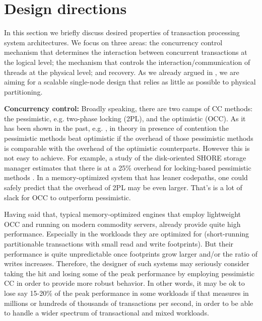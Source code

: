 \section{Design directions}

In this section we briefly discuss desired properties of transaction processing system architectures. We focus on three areas: the concurrency control mechanism that determines the interaction between concurrent transactions at the logical level; the mechanism that controls the interaction/communication of threads at the physical level; and recovery. As we already argued in , we are aiming for a scalable single-node design that relies as little as possible to physical partitioning.  

\vspace{2mm} 
{\bf Concurrency control:} 
Broadly speaking, there are two camps of CC methods: the pessimistic, e.g. two-phase locking (2PL), and the optimistic (OCC). As it has been shown in the past, e.g. \cite{AgrawalCL87}, in theory in presence of contention the  pessimistic methods beat optimistic if the overhead of those pessimistic methods is comparable with the overhead of the optimistic counterparts. However this is not easy to achieve. For example, a study of the disk-oriented SHORE storage manager estimates that there is at a 25\% overhead for locking-based pessimistic methods \cite{HarizopoulosAMS08}. In a memory-optimized system that has leaner codepaths, one could safely predict that the overhead of 2PL may be even larger. That's is a lot of slack for OCC to outperform pessimistic.

Having said that, typical memory-optimized engines that employ lightweight OCC and running on modern commodity servers, already provide quite high performance. Especially in the workloads they are optimized for (short-running partitionable transactions with small read and write footprints). But their performance is quite unpredictable once footprints grow larger and/or the ratio of writes increases. Therefore, the designer of such systems may seriously consider taking the hit and losing some of the peak performance by employing pessimistic CC in order to provide more robust behavior. In other words, it may be ok to lose say 15-20\% of the peak performance in some workloads if that measures in millions or hundreds of thousands of transactions per second, in order to be able to handle a wider spectrum of transactional and mixed workloads.

